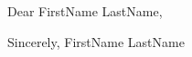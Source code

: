 \documentclass[11pt,a4paper,sans]{letter} %
\begin{document}
Dear FirstName LastName, %

\bigbreak %

\blindtext %

\blindtext %

\bigbreak %
Sincerely,
\bigbreak %
FirstName LastName %
\end{document}
